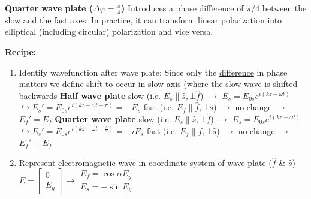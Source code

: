{\textbf{Quarter wave plate ($\Delta\varphi = \frac{\pi}{4}$)}\newline
Introduces a phase difference of $\pi/4$ between the slow and the fast axes. In practice, it can transform linear polarization into elliptical (including circular) polarization and vice versa.

\textbf{Recipe:}
\begin{enumerate}[label=\protect\circled{\arabic*}]
	\item Identify wavefunction after wave plate:\newline
	      Since only the \underline{difference} in phase matters we define shift to occur in slow axis (where the slow wave is shifted backwards
	      \vspace{1pt}\newline
	      \textbf{Half wave plate}\newline
	      \phantom{ } slow (i.e. $E_s \parallel \hat s, \bot \hat f$) $\rightarrow$ $E_s = E_{0s} e^{i(kz-\omega t)}$ \newline
	      \phantom{ } $\hookrightarrow E_s'= E_{0s} e^{i(kz-\omega t- \pi)} = -E_s$ \newline
	      \phantom{ } fast (i.e. $E_f \parallel \hat f, \bot \hat s$) $\rightarrow$  no change $\rightarrow$ $E_f'=E_f$\newline
	      \vspace{1pt}\newline
	      \textbf{Quarter wave plate}\newline
	      \phantom{ } slow (i.e. $E_s \parallel \hat s, \bot \hat f$) $\rightarrow$ $E_s = E_{0s} e^{i(kz-\omega t)}$ \newline
	      \phantom{ } $\hookrightarrow E_s'= E_{0s} e^{i(kz-\omega t- \frac{\pi}{2})} = -i E_s$ \newline
	      \phantom{ } fast (i.e. $E_f \parallel \hat f, \bot \hat s$) $\rightarrow$  no change $\rightarrow$ $E_f'=E_f$\newline
	\item Represent electromagnetic wave in coordinate system of wave plate ($\hat f$ \& $\hat s$)\newline
	      $\underline E = \begin{bmatrix}0 \\ E_y\end{bmatrix} \rightarrow \begin{matrix} E_f = \cos\alpha E_y \\ E_s = -\sin E_y \end{matrix}$

\end{enumerate}}
